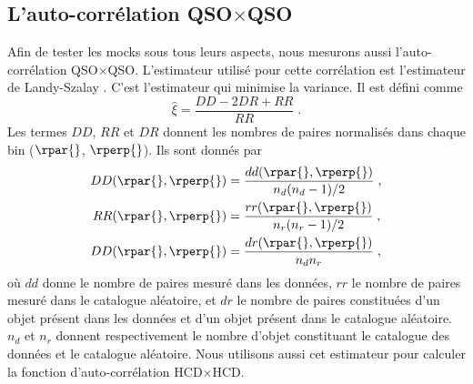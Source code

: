   \subsection{L'auto-corrélation QSO$\times$QSO}
  \label{subsec:co_estimateur}
Afin de tester les mocks sous tous leurs aspects, nous mesurons aussi l'auto-corrélation QSO$\times$QSO. L'estimateur utilisé pour cette corrélation est l'estimateur de Landy-Szalay \autocite{Landy1993}. C'est l'estimateur qui minimise la variance. Il est défini comme
\begin{equation}
  \label{eq:estimateur_co}
  \hat \xi = \frac{DD - 2DR + RR}{RR} \; .
\end{equation}
Les termes $DD$, $RR$ et $DR$ donnent les nombres de paires normalisés dans chaque bin ($\rpar{}$, $\rperp{}$). Ils sont donnés par
\begin{align}
  DD(\rpar{}, \rperp{}) &= \frac{dd(\rpar{}, \rperp{})}{n_d(n_d-1)/2} \; ,\\
  RR(\rpar{}, \rperp{}) &= \frac{rr(\rpar{}, \rperp{})}{n_r(n_r-1)/2} \; ,\\
  DD(\rpar{}, \rperp{}) &= \frac{dr(\rpar{}, \rperp{})}{n_dn_r}  \; ,
\end{align}
où $dd$ donne le nombre de paires mesuré dans les données, $rr$ le nombre de paires mesuré dans le catalogue aléatoire, et $dr$ le nombre de paires constituées d'un objet présent dans les données et d'un objet présent dans le catalogue aléatoire. $n_d$ et $n_r$ donnent respectivement le nombre d'objet constituant le catalogue des données et le catalogue aléatoire.
Nous utilisons aussi cet estimateur pour calculer la fonction d'auto-corrélation HCD$\times$HCD.


